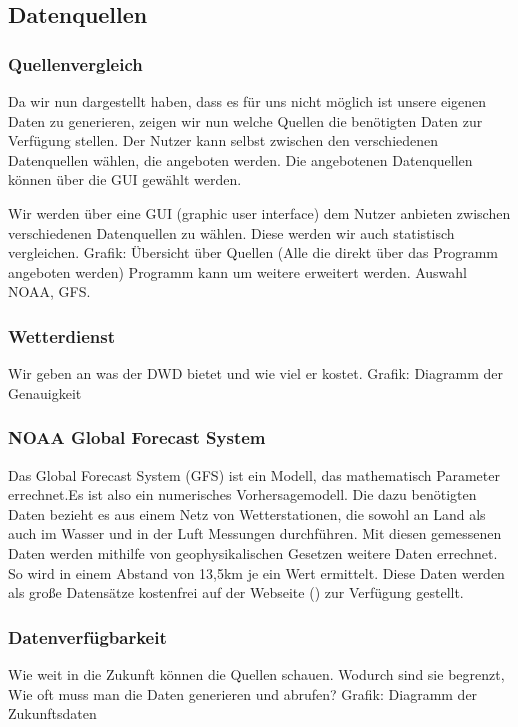 \documentclass[a4paper,oneside,10pt,titlepage]{article}
\begin{document}
\subsection{Datenquellen}
\subsubsection{Quellenvergleich}
Da wir nun dargestellt haben, dass es für uns nicht möglich ist unsere eigenen Daten zu generieren, zeigen wir nun welche Quellen die benötigten Daten zur Verfügung stellen. Der Nutzer kann selbst zwischen den verschiedenen Datenquellen wählen, die angeboten werden. Die angebotenen Datenquellen können über die GUI gewählt werden.

Wir werden über eine GUI (graphic user interface) dem Nutzer anbieten zwischen verschiedenen Datenquellen zu wählen. Diese werden wir auch statistisch vergleichen.
Grafik: Übersicht über Quellen (Alle die direkt über das Programm angeboten werden)
Programm kann um weitere erweitert werden.
Auswahl NOAA, GFS.
\subsubsection*{Wetterdienst}
Wir geben an was der DWD bietet und wie viel er kostet.
Grafik: Diagramm der Genauigkeit
\subsubsection*{NOAA Global Forecast System}

Das Global Forecast System (GFS) ist ein Modell, das mathematisch Parameter errechnet.Es ist also ein numerisches Vorhersagemodell. Die dazu benötigten Daten bezieht es aus einem Netz von Wetterstationen, die sowohl an Land als auch im Wasser und in der Luft Messungen durchführen. Mit diesen gemessenen Daten werden mithilfe von geophysikalischen Gesetzen weitere Daten errechnet. So wird in einem Abstand von 13,5km je ein Wert ermittelt. Diese Daten werden als große Datensätze kostenfrei auf der Webseite ()  zur Verfügung gestellt.
\subsubsection{Datenverfügbarkeit}
Wie weit in die Zukunft können die Quellen schauen. Wodurch sind sie begrenzt, Wie oft muss man die Daten generieren und abrufen?
Grafik: Diagramm der Zukunftsdaten
\end{document}
